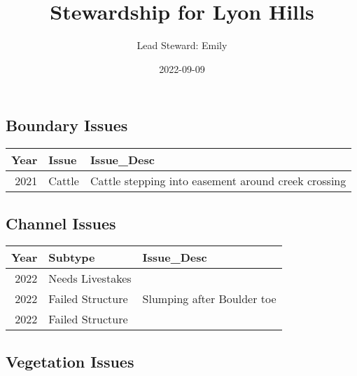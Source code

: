 \documentclass[
  landscape]{article}
\title{Stewardship for Lyon Hills}
\author{Lead Steward: Emily}
\date{2022-09-09}
\begin{document}
\maketitle

\hypertarget{boundary-issues}{%
\subsection{Boundary Issues}\label{boundary-issues}}

\begin{longtable}[]{@{}rll@{}}
\toprule()
Year & Issue & Issue\_Desc \\
\midrule()
\endhead
2021 & Cattle & Cattle stepping into easement around creek crossing \\
\bottomrule()
\end{longtable}

\hypertarget{channel-issues}{%
\subsection{Channel Issues}\label{channel-issues}}

\begin{longtable}[]{@{}rll@{}}
\toprule()
Year & Subtype & Issue\_Desc \\
\midrule()
\endhead
2022 & Needs Livestakes & \\
2022 & Failed Structure & Slumping after Boulder toe \\
2022 & Failed Structure & \\
\bottomrule()
\end{longtable}

\hypertarget{vegetation-issues}{%
\subsection{Vegetation Issues}\label{vegetation-issues}}
\end{document}
